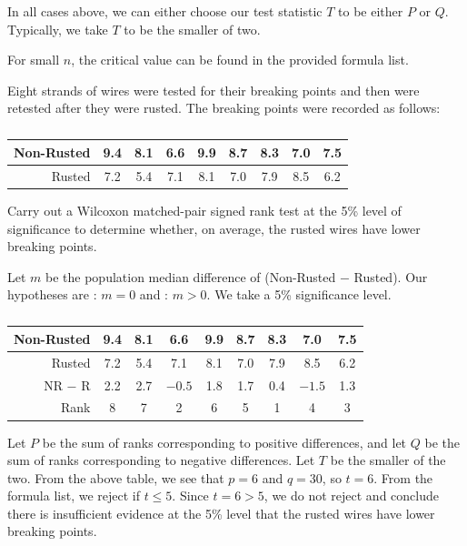 In all cases above, we can either choose our test statistic $T$ to be either $P$ or $Q$. Typically, we take $T$ to be the smaller of two.

For small $n$, the critical value can be found in the provided formula list.

\begin{sample}
    Eight strands of wires were tested for their breaking points and then were retested after they were rusted. The breaking points were recorded as follows:

    \begin{table}[H]
        \centering
        \begin{tabular}{|r|c|c|c|c|c|c|c|c|}
            \hline
            Non-Rusted & 9.4 & 8.1 & 6.6 & 9.9 & 8.7 & 8.3 & 7.0 & 7.5 \\ \hline
            Rusted & 7.2 & 5.4 & 7.1 & 8.1 & 7.0 & 7.9 & 8.5 & 6.2 \\ \hline
        \end{tabular}
        \caption{}
    \end{table}

    Carry out a Wilcoxon matched-pair signed rank test at the 5\% level of significance to determine whether, on average, the rusted wires have lower breaking points.
\end{sample}
\begin{sampans}
    Let $m$ be the population median difference of (Non-Rusted $-$ Rusted). Our hypotheses are \nullhyp: $m = 0$ and \althyp: $m > 0$. We take a 5\% significance level.

    \begin{table}[H]
        \centering
        \begin{tabular}{|r|c|c|c|c|c|c|c|c|}
            \hline
            Non-Rusted & 9.4 & 8.1 & 6.6 & 9.9 & 8.7 & 8.3 & 7.0 & 7.5 \\ \hline
            Rusted & 7.2 & 5.4 & 7.1 & 8.1 & 7.0 & 7.9 & 8.5 & 6.2 \\ \hline
            NR $-$ R & 2.2 & 2.7 & $-0.5$ & 1.8 & 1.7 & 0.4 & $-1.5$ & 1.3 \\ \hline
            Rank & 8 & 7 & 2 & 6 & 5 & 1 & 4 & 3 \\ \hline
        \end{tabular}
        \caption{}
    \end{table}

    Let $P$ be the sum of ranks corresponding to positive differences, and let $Q$ be the sum of ranks corresponding to negative differences. Let $T$ be the smaller of the two. From the above table, we see that $p = 6$ and $q = 30$, so $t = 6$. From the formula list, we reject \nullhyp{} if $t \leq 5$. Since $t = 6 > 5$, we do not reject \nullhyp{} and conclude there is insufficient evidence at the 5\% level that the rusted wires have lower breaking points.
\end{sampans}

